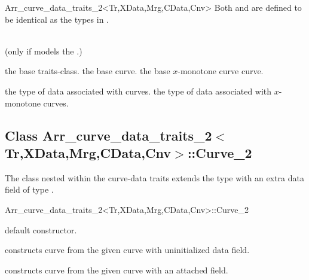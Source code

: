 \begin{ccRefClass}{Arr_curve_data_traits_2<Tr,XData,Mrg,CData,Cnv>}
Both  and  are defined
to be identical as the types in .

 
\ccIsModel
     \\
     (only if  models the
    .) \\

\ccTypes

    {the base traits-class.}
\ccGlue
{}
    {the base curve.}
\ccGlue
{}
    {the base $x$-monotone curve curve.}

\ccGlue
{}

    {the type of data associated with curves.}
\ccGlue
{}
    {the type of data associated with $x$-monotone curves.}

\ccInheritsFrom

\subsection*{Class Arr\_curve\_data\_traits\_2$<$Tr,XData,Mrg,CData,Cnv$>$::Curve\_2}

The  class nested within the curve-data traits
extends the  type with an extra data field of type
.

\begin{ccClass}{Arr_curve_data_traits_2<Tr,XData,Mrg,CData,Cnv>::Curve_2}

\ccInheritsFrom

\ccCreation
{}

    {default constructor.}

    {constructs curve from the given  curve with uninitialized
     data field.}

    {constructs curve from the given  curve with an attached
      field.}


\end{ccClass}
\end{ccRefClass}
